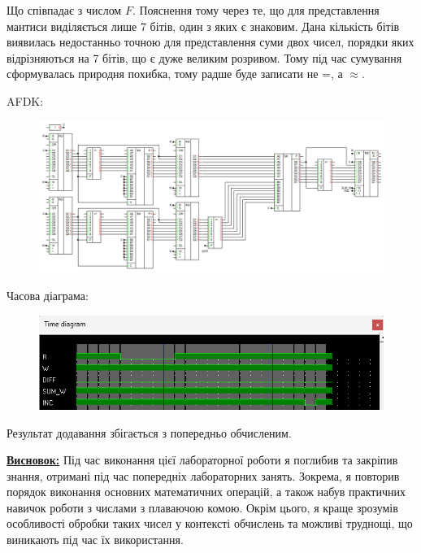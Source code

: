 \documentclass[12pt,a4paper]{article}
\begin{document}
    Що співпадає з числом $F$. Пояснення тому через те, що для представлення мантиси виділяється лише 7 бітів, один з яких є знаковим.
    Дана кількість бітів виявилась недостанньо точною для представлення суми двох чисел, порядки яких відрізняються на 7 бітів, що є дуже великим розривом.
    Тому під час сумування сформувалась природня похибка, тому радше буде записати не =, а $\approx$.

    \newpage

    AFDK:

    \begin{figure}[ht]
        \includegraphics[width=1.0\textwidth]{schemma4.png}
    \end{figure}

    Часова діаграма:

    \begin{figure}[ht]
        \includegraphics[width=1.0\textwidth]{time4.png}
    \end{figure}

    Результат додавання збігається з попередньо обчисленим.

    \vspace{4em}
    \setlength{\parindent}{0pt}

    \textbf{\underline{Висновок:}}
    Під час виконання цієї лабораторної роботи я поглибив та закріпив знання, отримані під час попередніх лабораторних занять. Зокрема, я повторив порядок виконання основних математичних операцій, а також набув практичних навичок роботи з числами з плаваючою комою. Окрім цього, я краще зрозумів особливості обробки таких чисел у контексті обчислень та можливі труднощі, що виникають під час їх використання.
\end{document}
